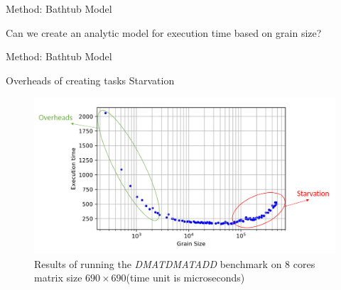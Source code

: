 \documentclass[10pt]{beamer}
\begin{document}

\begin{frame}{Method: Bathtub Model}
	\begin{outline}
		Can we create an analytic model for execution time based on grain size?
	\end{outline}
\end{frame}




\begin{frame}{Method: Bathtub Model}
	\begin{outline}		
		\1Overheads of creating tasks
		\1Starvation
		\begin{figure}
			
			\includegraphics[width=0.9\linewidth]{images/bathtub/all_690_4_star_over.png}	
			\caption{Results of running the \textit{DMATDMATADD} benchmark on $8$ cores matrix size $690\times690$(time unit is microseconds)}	
		\end{figure}
	\end{outline}
\end{frame}
\end{document}
